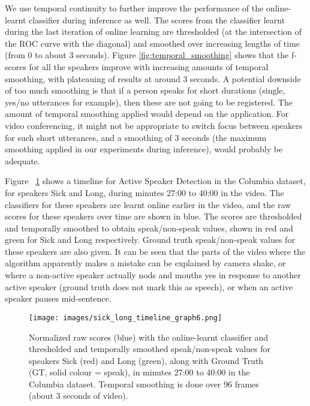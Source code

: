 \documentclass[runningheads]{llncs}
\begin{document}
We use temporal continuity to further improve the performance of the online-learnt classifier during inference as well. The scores from the classifier learnt during the last iteration of online learning are thresholded (at the intersection of the ROC curve with the diagonal) and smoothed over increasing lengths of time (from 0 to about 3 seconds). Figure \ref{fig:temporal_smoothing} shows that the f-scores for all the speakers improve with increasing amounts of temporal smoothing, with plateauing of results at around 3 seconds. A potential downside of too much smoothing is that if a person speaks for short durations (single, yes/no utterances for example), then these are not going to be registered. The amount of temporal smoothing applied would depend on the application. For video conferencing, it might not be appropriate to switch focus between speakers for such short utterances, and a smoothing of 3 seconds (the maximum smoothing applied in our experiments during inference), would probably be adequate.

Figure ~\ref{fig:activeSpeakerDetectionErrors} shows a timeline for Active Speaker Detection in the Columbia dataset, for speakers Sick and Long, during minutes 27:00 to 40:00 in the video. The classifiers for these speakers are learnt online earlier in the video, and the raw scores for these speakers over time are shown in blue. The scores are thresholded and temporally smoothed to obtain speak/non-speak values, shown in red and green for Sick and Long respectively. Ground truth speak/non-speak values for these speakers are also given. It can be seen that the parts of the video where the algorithm apparently makes a mistake can be explained by camera shake, or where a non-active speaker actually nods and mouths yes in response to another active speaker (ground truth does not mark this as speech), or when an active speaker pauses mid-sentence.



\begin{figure}[t]
\begin{center}
    \texttt{[image: images/sick\_long\_timeline\_graph6.png]} 
\end{center}
\vspace*{-0.6cm} 
   \caption{Normalized raw scores (blue) with the online-learnt classifier and thresholded and temporally smoothed speak/non-speak values for speakers Sick (red) and Long (green), along with Ground Truth (GT, solid colour = speak), in minutes 27:00 to 40:00 in the Columbia dataset. Temporal smoothing is done over 96 frames (about 3 seconds of video).}
\label{fig:activeSpeakerDetectionErrors}
 \vspace*{-0.6cm} 
\end{figure}
\end{document}
